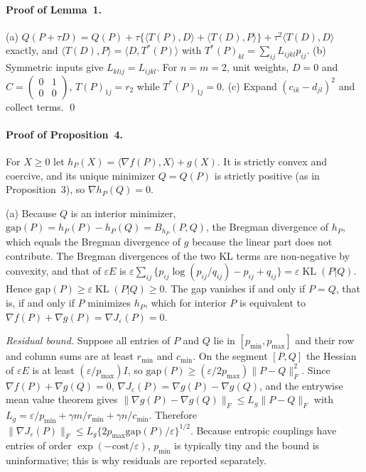 \documentclass[12pt]{article}
\newcommand{\KL}{\operatorname{KL}}
\begin{document}
\paragraph{Proof of Lemma~1.}
(a) $Q(P+\tau D)=Q(P)+\tau\{\langle T(P),D\rangle+\langle T(D),P\rangle\}+\tau^2\langle T(D),D\rangle$ exactly, and $\langle T(D),P\rangle=\langle D,T^\ast(P)\rangle$ with $T^\ast(P)_{kl}=\sum_{ij}L_{ijkl}p_{ij}$. (b) Symmetric inputs give $L_{klij}=L_{ijkl}$. For $n=m=2$, unit weights, $D=0$ and $C=\left(\begin{smallmatrix}0&1\\0&0\end{smallmatrix}\right)$, $T(P)_{1j}=r_2$ while $T^\ast(P)_{1j}=0$. (c) Expand $(c_{ik}-d_{jl})^2$ and collect terms. \qed

\paragraph{Proof of Proposition~4.}
For $X\ge0$ let $h_P(X)=\langle\nabla f(P),X\rangle+g(X)$. It is strictly convex and coercive, and its unique minimizer $Q=Q(P)$ is strictly positive (as in Proposition~3), so $\nabla h_P(Q)=0$.

(a) Because $Q$ is an interior minimizer, $\mathrm{gap}(P)=h_P(P)-h_P(Q)=B_{h_P}(P,Q)$, the Bregman divergence of $h_P$, which equals the Bregman divergence of $g$ because the linear part does not contribute. The Bregman divergences of the two KL terms are non-negative by convexity, and that of $\varepsilon E$ is $\varepsilon\sum_{ij}\{p_{ij}\log(p_{ij}/q_{ij})-p_{ij}+q_{ij}\}=\varepsilon\KL(P|Q)$. Hence $\mathrm{gap}(P)\ge\varepsilon\KL(P|Q)\ge0$. The gap vanishes if and only if $P=Q$, that is, if and only if $P$ minimizes $h_P$, which for interior $P$ is equivalent to $\nabla f(P)+\nabla g(P)=\nabla J_\varepsilon(P)=0$.

\emph{Residual bound.} Suppose all entries of $P$ and $Q$ lie in $[p_{\min},p_{\max}]$ and their row and column sums are at least $r_{\min}$ and $c_{\min}$. On the segment $[P,Q]$ the Hessian of $\varepsilon E$ is at least $(\varepsilon/p_{\max})I$, so $\mathrm{gap}(P)\ge(\varepsilon/2p_{\max})\|P-Q\|_F^2$. Since $\nabla f(P)+\nabla g(Q)=0$, $\nabla J_\varepsilon(P)=\nabla g(P)-\nabla g(Q)$, and the entrywise mean value theorem gives $\|\nabla g(P)-\nabla g(Q)\|_F\le L_g\|P-Q\|_F$ with $L_g=\varepsilon/p_{\min}+\gamma m/r_{\min}+\gamma n/c_{\min}$. Therefore $\|\nabla J_\varepsilon(P)\|_F\le L_g\{2p_{\max}\mathrm{gap}(P)/\varepsilon\}^{1/2}$. Because entropic couplings have entries of order $\exp(-\mathrm{cost}/\varepsilon)$, $p_{\min}$ is typically tiny and the bound is uninformative; this is why residuals are reported separately.
\end{document}
